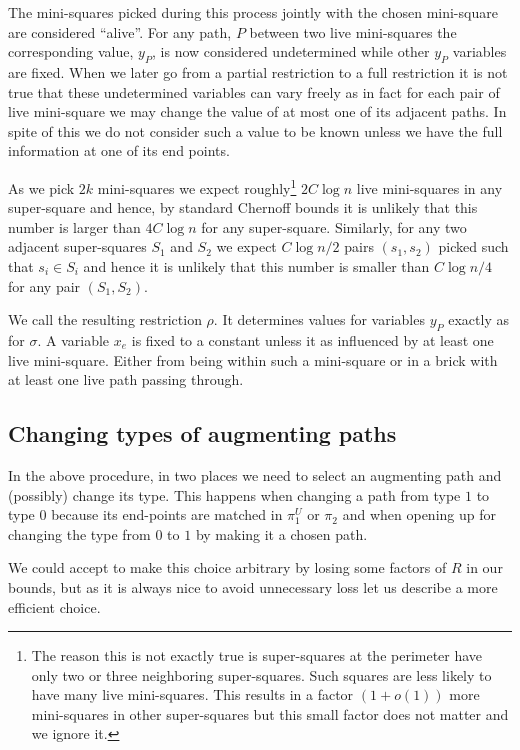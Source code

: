 \documentclass{article}\usepackage[a4paper,margin=20mm]{geometry}
\begin{document}
The mini-squares picked during this process jointly with
the chosen mini-square are considered ``alive''.
For any path, $P$ between two live mini-squares the
corresponding value, $y_P$, is now considered undetermined while other
$y_P$ variables are fixed.  When we later go from
a partial restriction to a full restriction it is not true that
these undetermined variables can vary freely as in fact for 
each pair of live mini-square we may change the value of
at most one of its adjacent paths.  In spite of this
we do not consider such a value to be known unless
we have the full information at one of its end points.


As we pick $2k$ mini-squares we
expect roughly\footnote{The reason this is not exactly true
is super-squares at the perimeter have only two or three neighboring
super-squares.  Such squares are less likely to have many live mini-squares.  
This results in a factor $(1+o(1))$ more mini-squares in
other super-squares but this small factor does not matter and
we ignore it.}
$2C \log n$ live mini-squares in any super-square and hence,
by standard Chernoff bounds it is unlikely that this number is
larger than $4C \log n$ for any super-square.
Similarly, for any two adjacent super-squares $S_1$ and $S_2$ we expect
$C \log n /2$ pairs $(s_1,s_2)$ picked such that $s_i \in S_i$
and hence it is unlikely that this number is smaller than 
$C \log n/4$ for any pair $(S_1,S_2)$.

We call the resulting restriction $\rho$.  It determines values
for variables $y_P$ exactly as for $\sigma$.  
A variable $x_e$ is fixed to a constant
unless it as influenced by at  least one live mini-square.  Either from
being within such a mini-square or in a brick with at least one
live path passing through.

\subsection{Changing types of augmenting paths} \label{sec:change}

In the above procedure, in two places we need to select
an augmenting path and (possibly) change its type.
This happens when changing a path from type $1$ to type $0$ because its end-points are matched in $\pi_1^U$
or $\pi_2$ and when opening up for changing the type from
$0$ to $1$ by making it a chosen path.

We could accept to make this choice arbitrary by losing
some factors of $R$ in our bounds, but as it is always
nice to avoid unnecessary loss let us describe a
more efficient choice.
\end{document}

